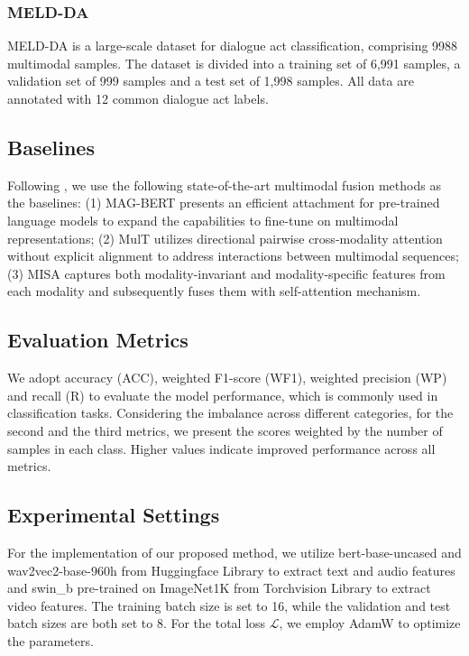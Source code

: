 \documentclass[letterpaper]{article}
\begin{document}
\subsubsection{MELD-DA}
MELD-DA \cite{saha-etal-2020-towards} is a large-scale dataset for dialogue act classification, comprising 9988 multimodal samples. The dataset is divided into a training set of 6,991 samples, a validation set of 999 samples and a test set of 1,998 samples. All data are annotated with 12 common dialogue act labels.

\subsection{Baselines}
Following \cite{10.1145/3503161.3547906}, we use the following state-of-the-art multimodal fusion methods as the baselines: (1) MAG-BERT \cite{rahman2020integrating} presents an efficient attachment for pre-trained language models to expand the capabilities to fine-tune on multimodal representations; (2) MulT \cite{tsai2019multimodal} utilizes directional pairwise cross-modality attention without explicit alignment to address interactions between multimodal sequences; (3) MISA \cite{10.1145/3394171.3413678} captures both modality-invariant and modality-specific features from each modality and subsequently fuses them with self-attention mechanism.


\subsection{Evaluation Metrics}
We adopt accuracy (ACC), weighted F1-score (WF1), weighted precision (WP) and recall (R) to evaluate the model performance, which is commonly used in classification tasks. Considering the imbalance across different categories, for the second and the third metrics, we present the scores weighted by the number of samples in each class. Higher values indicate improved performance across all metrics.


\subsection{Experimental Settings}
For the implementation of our proposed method, we utilize bert-base-uncased and wav2vec2-base-960h from Huggingface Library \cite{wolf2019huggingface} to extract text and audio features and swin\_b pre-trained on ImageNet1K \cite{5206848} from Torchvision Library \cite{torchvision2016} to extract video features. The training batch size is set to 16, while the validation and test batch sizes are both set to 8. For the total loss $\mathcal{L}$, we employ AdamW \cite{loshchilov2017decoupled} to optimize the parameters.
\end{document}
